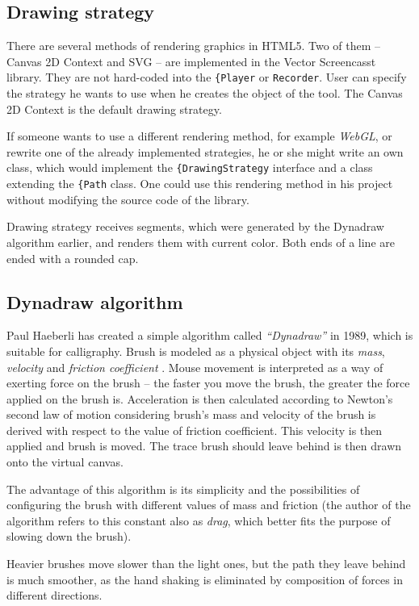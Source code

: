 \subsection{Drawing strategy}
There are several methods of rendering graphics in HTML5. Two of them -- Canvas 2D Context and SVG -- are implemented in the Vector Screencasst library. They are not hard-coded into the \verb|{Player| or \verb|Recorder|. User can specify the strategy he wants to use when he creates the object of the tool. The Canvas 2D Context is the default drawing strategy.

If someone wants to use a different rendering method, for example \textit{WebGL}, or rewrite one of the already implemented strategies, he or she might write an own class, which would implement the \verb|{DrawingStrategy| interface and a class extending the \verb|{Path| class. One could use this rendering method in his project without modifying the source code of the library.

Drawing strategy receives segments, which were generated by the Dynadraw algorithm earlier, and renders them with current color. Both ends of a line are ended with a rounded cap.


\subsection{Dynadraw algorithm}
\label{sec:dynadraw}

Paul Haeberli has created a simple algorithm called \textit{``Dynadraw''} in 1989, which is suitable for calligraphy. Brush is modeled as a physical object with its \textit{mass}, \textit{velocity} and \textit{friction coefficient} \cite{dynadraw}. Mouse movement is interpreted as a way of exerting force on the brush -- the faster you move the brush, the greater the force applied on the brush is. Acceleration is then calculated according to Newton's second law of motion considering brush's mass and velocity of the brush is derived with respect to the value of friction coefficient. This velocity is then applied and brush is moved. The trace brush should leave behind is then drawn onto the virtual canvas.

The advantage of this algorithm is its simplicity and the possibilities of configuring the brush with different values of mass and friction (the author of the algorithm refers to this constant also as \textit{drag}, which better fits the purpose of slowing down the brush).

Heavier brushes move slower than the light ones, but the path they leave behind is much smoother, as the hand shaking is eliminated by composition of forces in different directions.

